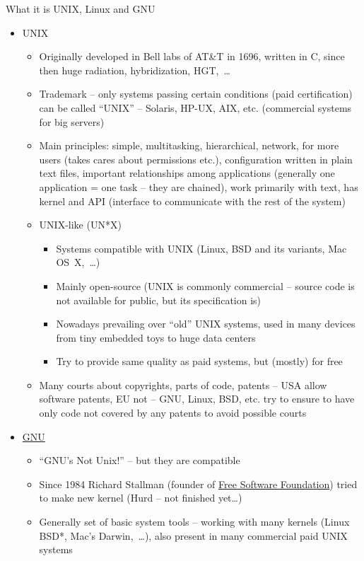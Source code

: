 \documentclass[compress, ucs, xelatex, 11pt, xcolor=svgnames,
  hyperref={
    bookmarks=true,
    unicode=true,
    colorlinks=true,
    pdftitle={Linux, command line and MetaCentrum},
    plainpages=false,
    pdfauthor={Vojtech Zeisek},
    pdfsubject={Course about use of Linux command line, writing shell scripts and using MetaCentrum of CESNET},
    pdfcreator={XeLaTeX},
    pdfkeywords={Linux, GNU, BASH, shell, command line, MetaCentrum},
    linkcolor=DarkRed,
    anchorcolor=DarkBlue,
    citecolor=Indigo,
    filecolor=NavyBlue,
    menucolor=DarkMagenta,
    urlcolor=DarkBlue,
    pdftex},
  url={hyphens, lowtilde} %
  ]{beamer}
\begin{document}
\begin{frame}[allowframebreaks]{What it is UNIX, Linux and GNU}
  \begin{itemize}
    \item UNIX
    \begin{itemize}
      \item Originally developed in Bell labs of AT\&T in 1696, written in C, since then  huge radiation, hybridization, HGT,~\ldots
      \item Trademark -- only systems passing certain conditions (paid certification) can be called ``UNIX'' -- Solaris, HP-UX, AIX, etc. (commercial systems for big servers)
      \item Main principles: simple, multitasking, hierarchical, network, for more users (takes cares about permissions etc.), configuration written in plain text files, important relationships among applications (generally one application = one task -- they are chained), work primarily with text, has kernel and API (interface to communicate with the rest of the system)
      \item UNIX-like (UN*X)
      \begin{itemize}
	\item Systems compatible with UNIX (Linux, BSD and its variants, Mac OS~X,~\ldots)
	\item Mainly open-source (UNIX is commonly commercial -- source code is not available for public, but its specification is)
	\item Nowadays prevailing over ``old'' UNIX systems, used in many devices from tiny embedded toys to huge data centers
	\item Try to provide same quality as paid systems, but (mostly) for free
      \end{itemize}
      \item Many courts about copyrights, parts of code, patents -- USA allow software patents, EU not -- GNU, Linux, BSD, etc. try to ensure to have only code not covered by any patents to avoid possible courts
    \end{itemize}
    \item \href{https://www.gnu.org/}{GNU}
    \begin{itemize}
      \item ``GNU's Not Unix!'' -- but they are compatible
      \item Since 1984 Richard Stallman (founder of \href{https://www.fsf.org/}{Free Software Foundation}) tried to make new kernel (Hurd -- not finished yet\ldots)
      \item Generally set of basic system tools -- working with many kernels (Linux BSD*, Mac's Darwin,~\ldots), also present in many commercial paid UNIX systems

\end{itemize}
\end{itemize}
\end{frame}
\end{document}

